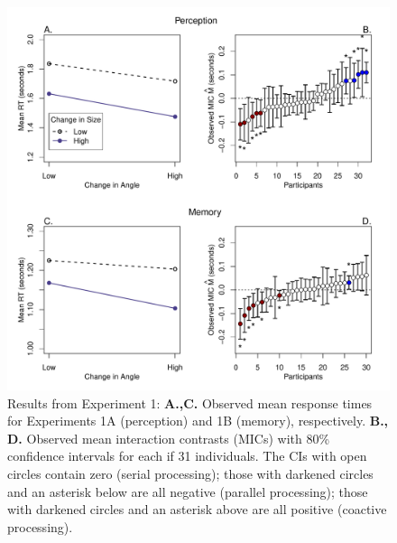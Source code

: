 \documentclass[fignum,nobf,man]{apa}
\begin{document}
\begin{figure}
\centering
\includegraphics[width=6in]{jonFigures/jE1.pdf}
\caption{Results from Experiment 1:  {\bf A.,C.} Observed mean response times for Experiments 1A (perception) and 1B (memory), respectively.  {\bf B., D.} Observed mean interaction contrasts (MICs) with 80\% confidence intervals for each if 31 individuals.  The CIs with open circles contain zero (serial processing); those with darkened circles and an asterisk below are all negative (parallel processing); those with darkened circles and an asterisk above are all positive (coactive processing).}
\label{surf1}
\end{figure}
\end{document}
